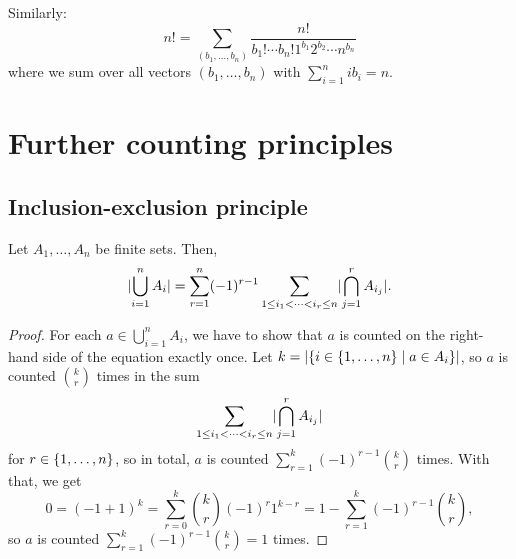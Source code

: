 \documentclass[language=english]{../../Template/TemplateLecture}
\begin{document}
Similarly:
\begin{equation}
    n! = \sum_{(b_1,\ldots,b_n)}\frac{n!}{b_1!\cdots b_n! 1^{b_1} 2^{b_2} \cdots n^{b_n}}
\end{equation}
where we sum over all vectors $(b_1,\ldots,b_n)$ with $\sum_{i = 1}^n ib_i = n$.


\section{Further counting principles}
\subsection{Inclusion-exclusion principle}
\begin{prop}
    Let $A_1, \ldots, A_n$ be finite sets. Then, 
    \begin{equation}
        \lvert\bigcup_{i = 1}^n A_i\rvert = \sum_{r = 1}^n (-1)^{r-1} \sum_{1 \leq i_1 < \cdots < i_r \leq n} \lvert\bigcap_{j = 1}^r A_{i_j}\rvert.
    \end{equation}
\end{prop}

\begin{proof}
    For each $a \in \bigcup_{i = 1}^n A_i$, we have to show that $a$ is counted on the right-hand side of the equation exactly once. Let $k = \lvert\{i \in \{1,\ldots,n\} \mid a \in A_i\}\rvert$, so $a$ is counted $\binom{k}{r}$ times in the sum 
    \begin{equation}
        \sum_{1 \leq i_1 < \cdots < i_r \leq n} \lvert\bigcap_{j = 1}^r A_{i_j}\rvert
    \end{equation}
    for $r \in \{1,\ldots,n\}$, so in total, $a$ is counted $\sum_{r = 1}^k (-1)^{r-1} \binom{k}{r}$ times. With that, we get 
    \begin{equation}
        0 = (-1 + 1)^k = \sum_{r = 0}^k \binom{k}{r} (-1)^r 1^{k-r} = 1 - \sum_{r = 1}^k (-1)^{r-1} \binom{k}{r},
    \end{equation}
    so $a$ is counted $\sum_{r = 1}^k (-1)^{r-1} \binom{k}{r} = 1$ times.
\end{proof}
\end{document}
